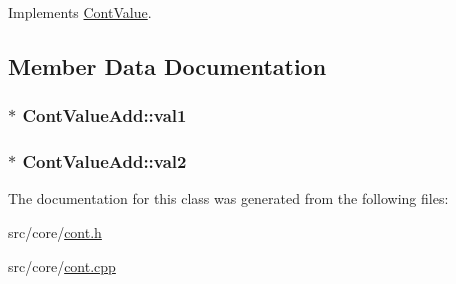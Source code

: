 Implements \hyperlink{a00086_ae3ce98084899bf1a873a1ec6bf15116e}{Cont\-Value}.



\subsection{Member Data Documentation}
\hypertarget{a00087_a7a1dd6b15ca41dcf105f2e4f6d5b399d}{
\subsubsection[{val1}]{$\ast$ Cont\-Value\-Add\-::val1\hspace{0.3cm}{\ttfamily [private]}}}\label{a00087_a7a1dd6b15ca41dcf105f2e4f6d5b399d}
\hypertarget{a00087_ab591019408eecc0a2d78eb4cdcd81dba}{
\subsubsection[{val2}]{ $\ast$ Cont\-Value\-Add\-::val2\hspace{0.3cm}{\ttfamily [private]}}}\label{a00087_ab591019408eecc0a2d78eb4cdcd81dba}


The documentation for this class was generated from the following files\-:\begin{DoxyCompactItemize}
\item 
src/core/\hyperlink{a00218}{cont.\-h}\item 
src/core/\hyperlink{a00217}{cont.\-cpp}\end{DoxyCompactItemize}
